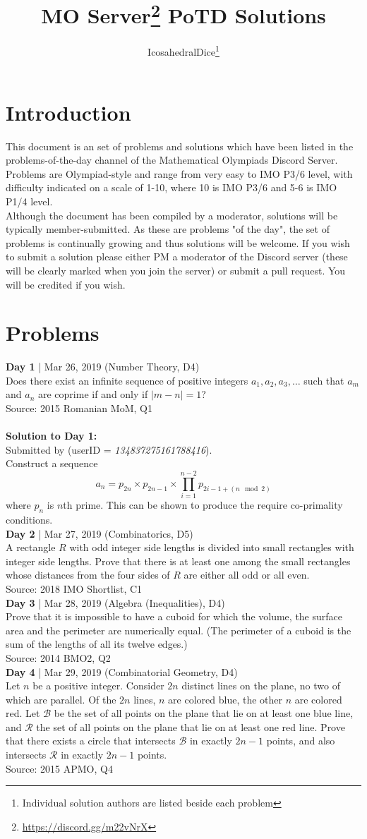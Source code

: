 \documentclass{article}
\title{MO Server\thanks{\url{https://discord.gg/m22vNrX}} PoTD Solutions}
\author{IcosahedralDice\thanks{Individual solution authors are listed beside each problem}}
\newcommand{\problem}[6]{
\textbf{Day #1} | #2 (#5, D#6)\\
#4 \\
Source: #3\\
}
\newcommand{\solution}[4]{
\textbf{Solution to Day #1:}\\
Submitted by \textit{#2} (userID = \textit{#3}). \\
#4\\
}
\begin{document}
\maketitle
\section{Introduction}
This document is an set of problems and solutions which have been listed in the problems-of-the-day channel of the Mathematical Olympiads Discord Server. Problems are Olympiad-style and range from very easy to IMO P3/6 level, with difficulty indicated on a scale of 1-10, where 10 is IMO P3/6 and 5-6 is IMO P1/4 level. \\
Although the document has been compiled by a moderator, solutions will be typically member-submitted. As these are problems "of the day", the set of problems is continually growing and thus solutions will be welcome. If you wish to submit a solution please either PM a moderator of the Discord server (these will be clearly marked when you join the server) or submit a pull request. You will be credited if you wish. 

\section{Problems}
\problem{1}{Mar 26, 2019}{2015 Romanian MoM, Q1}{Does there exist an infinite sequence of positive integers $a_1, a_2, a_3, \dots$ such that $a_m$ and $a_n$ are coprime if and only if $\vert m - n \vert = 1$?}{Number Theory}{4}\\
\solution{1}{}{134837275161788416}{Construct a sequence $$a_n = p_{2n}\times p_{2n-1}\times \prod_{i=1}^{n-2} {p_{2i-1+(n \mod 2)}}$$ where $p_n$ is $n$th prime. This can be shown to produce the require co-primality conditions.}

\problem{2}{Mar 27, 2019}{2018 IMO Shortlist, C1}{A rectangle $R$ with odd integer side lengths is divided into small rectangles with integer side lengths. Prove that there is at least one among the small rectangles whose distances from the four sides of $R$ are either all odd or all even.}{Combinatorics}{5}

\problem{3}{Mar 28, 2019}{2014 BMO2, Q2}{Prove that it is impossible to have a cuboid for which the volume, the surface area and the perimeter are numerically equal. (The perimeter of a cuboid is the sum of the lengths of all its twelve edges.)}{Algebra (Inequalities)}{4}

\problem{4}{Mar 29, 2019}{2015 APMO, Q4}{Let $n$ be a positive integer. Consider $2n$ distinct lines on the plane, no two of which are parallel. Of the $2n$ lines, $n$ are colored blue, the other $n$ are colored red. Let $\mathcal{B}$ be the set of all points on the plane that lie on at least one blue line, and $\mathcal{R}$ the set of all points on the plane that lie on at least one red line. Prove that there exists a circle that intersects $\mathcal{B}$ in exactly $2n-1$ points, and also intersects $\mathcal{R}$ in exactly $2n-1$ points.}{Combinatorial Geometry}{4}
\end{document}
